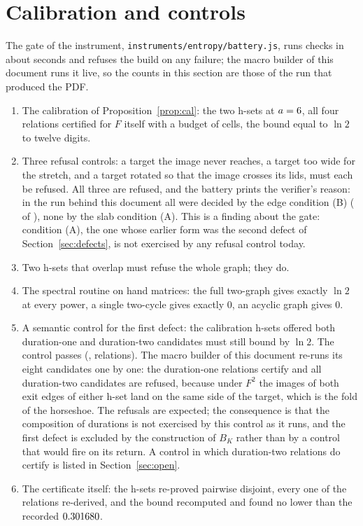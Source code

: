 \documentclass[11pt]{article}
\begin{document}
\section{Calibration and controls}\label{sec:battery}

The gate of the instrument, \texttt{instruments/entropy/battery.js}, runs \BatteryPass{} checks in about
\BatterySeconds{} seconds and refuses the build on any failure; the macro builder of this document runs it live, so
the counts in this section are those of the run that produced the PDF.
\begin{enumerate}
\item The calibration of Proposition~\ref{prop:cal}: the two h-sets at $a=6$, all four relations certified for
$F$ itself with a budget of \CalCells{} cells, the bound equal to $\ln2$ to twelve digits.
\item Three refusal controls: a target the image never reaches, a target too wide for the stretch, and a target
rotated so that the image crosses its lids, must each be refused. All three are refused, and the battery prints the
verifier's reason: in the run behind this document all \RedRefusals{} were decided by the edge condition (B)
(\RedByEdge{} of \RedRefusals), none by the slab condition (A). This is a finding about the gate: condition (A), the one
whose earlier form was the second defect of Section~\ref{sec:defects}, is not exercised by any refusal control
today.
\item Two h-sets that overlap must refuse the whole graph; they do.
\item The spectral routine on hand matrices: the full two-graph gives exactly $\ln2$ at every power, a single
two-cycle gives exactly $0$, an acyclic graph gives $0$.
\item A semantic control for the first defect: the calibration h-sets offered both duration-one and duration-two
candidates must still bound by $\ln2$. The control passes (\ControlBound, \ControlRelations{} relations). The
macro builder of this document re-runs its eight candidates one by one: the \ControlDurOne{} duration-one
relations certify and all \ControlDurTwoSameSide{} duration-two candidates are refused, because under $F^2$ the
images of both exit edges of either h-set land on the same side of the target, which is the fold of the horseshoe.
The refusals are expected; the consequence is that the composition of durations is not exercised by this control
as it runs, and the first defect is excluded by the construction of $B_K$ rather than by a control that would fire
on its return. A control in which duration-two relations do certify is listed in Section~\ref{sec:open}.
\item The certificate itself: the \NBoxes{} h-sets re-proved pairwise disjoint, every one of the \NEdges{}
relations re-derived, and the bound recomputed and found no lower than the recorded $0.301680$.
\end{enumerate}
\end{document}
